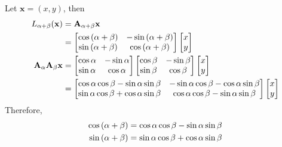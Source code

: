 \documentclass[10pt]{article}
\begin{document}
\begin{enumerate}[leftmargin=*, label={(\alph*)}]
    Let $\mathbf{x} = (x, y)$, then
    \begin{align*}
        L_{\alpha+\beta}(\mathbf{x}) &= \mathbf{A}_{\alpha+\beta}\mathbf{x} \\
        &= \begin{bmatrix}
            \cos\qty(\alpha+\beta) & -\sin\qty(\alpha+\beta) \\ \sin\qty(\alpha+\beta) & \cos\qty(\alpha+\beta)
        \end{bmatrix}\begin{bmatrix}
            x \\ y
        \end{bmatrix} \\
        \mathbf{A}_\alpha\mathbf{A}_\beta\mathbf{x} &= \begin{bmatrix}
            \cos\alpha & -\sin\alpha \\ \sin\alpha & \cos\alpha
        \end{bmatrix}\begin{bmatrix}
            \cos\beta & -\sin\beta \\ \sin\beta & \cos\beta
        \end{bmatrix}\begin{bmatrix}
            x \\ y
        \end{bmatrix} \\
        &= \begin{bmatrix}
            \cos\alpha\cos\beta - \sin\alpha\sin\beta & - \sin\alpha\cos\beta - \cos\alpha\sin\beta \\ \sin\alpha\cos\beta + \cos\alpha\sin\beta & \cos\alpha\cos\beta - \sin\alpha\sin\beta
        \end{bmatrix}\begin{bmatrix}
            x \\ y
        \end{bmatrix}
    \end{align*}
    Therefore, 
    \begin{align*}
        \cos\qty(\alpha+\beta) &= \cos\alpha\cos\beta - \sin\alpha\sin\beta \\
        \sin\qty(\alpha+\beta) &= \sin\alpha\cos\beta + \cos\alpha\sin\beta
    \end{align*}
\end{enumerate}
\end{document}
